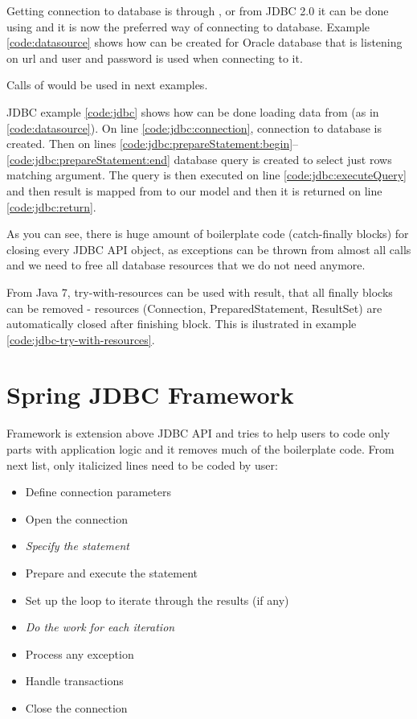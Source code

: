 Getting connection to database is through , or from JDBC 2.0
it can be done using  and it is now the preferred way of connecting to database.
Example \ref{code:datasource} shows how  can be created for Oracle database
that is listening on url 
and  user and  password is used when connecting to it.

Calls of  would be used in next examples.


JDBC example \ref{code:jdbc} shows how can be done loading data from  (as in \ref{code:datasource}).
On line \ref{code:jdbc:connection}, connection to database is created.
Then on lines \ref{code:jdbc:prepareStatement:begin}--\ref{code:jdbc:prepareStatement:end}
database query is created to select just rows matching  argument.
The query is then executed on line \ref{code:jdbc:executeQuery} and then
result is mapped from  to our  model and then it is returned on line \ref{code:jdbc:return}.

As you can see, there is huge amount of boilerplate code (catch-finally blocks) for closing every JDBC API object,
as exceptions can be thrown from almost all calls and we need to free all database resources that we do not need anymore.

From Java 7, try-with-resources can be used with result, that all finally blocks can be removed - resources
(Connection, PreparedStatement, ResultSet) are automatically closed after finishing block.
This is ilustrated in example \ref{code:jdbc-try-with-resources}.





\section{Spring JDBC Framework \label{frameworks:jdbcTemplate}}
\citet{SpringJDBC} Framework is extension above JDBC API and tries to help users to code only
parts with application logic and it removes much of the boilerplate code.
From next list, only italicized lines need to be coded by user:
\begin{itemize}
  \item Define connection parameters
  \item Open the connection
  \item \textit{Specify the statement}
  \item Prepare and execute the statement
  \item Set up the loop to iterate through the results (if any)
  \item \textit{Do the work for each iteration}
  \item Process any exception
  \item Handle transactions
  \item Close the connection   
\end{itemize}

